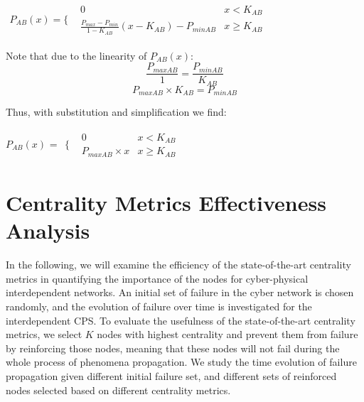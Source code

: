 \documentclass[letterpaper, 10 pt, conference]{ieeeconf}  %
\begin{document}
{\tiny
 $
\begin{array}{cc}
	P_{AB}(x) = \{ &
    	\begin{array}{cc}
        0 & x < K_{AB} \\
        \frac{P_{max}-P_{min}}{1-K_{AB}}(x - K_{AB}) - P_{minAB} & x \geq K_{AB}
      	\end{array}
\end{array}
$}
\newline

Note that due to the linearity of $P_{AB}(x)$: \[
\frac{P_{maxAB}}{1} = \frac{P_{minAB}}{K_{AB}}
\]
\[
P_{maxAB}\times K_{AB} = P_{minAB}
\]

Thus, with substitution and simplification we find:

$P_{AB}(x)$ =
$
\begin{array}{cc}
	\{ &
    	\begin{array}{cc}
        0 & x < K_{AB} \\
        P_{maxAB} \times x & x \geq K_{AB}
      	\end{array}
\end{array}
$

\section{Centrality Metrics Effectiveness Analysis} In the following, we will examine the efficiency of the state-of-the-art centrality metrics in quantifying the importance of the nodes for cyber-physical interdependent networks. An initial set of failure in the cyber network is chosen randomly, and the evolution of failure over time is investigated for the interdependent CPS. To evaluate the usefulness of the state-of-the-art centrality metrics, we select $K$ nodes with highest centrality and prevent them from failure by reinforcing those nodes, meaning that these nodes will not fail during the whole process of phenomena propagation. We study the time evolution of failure propagation given different initial failure set, and different sets of reinforced nodes selected based on different centrality metrics.
\end{document}
